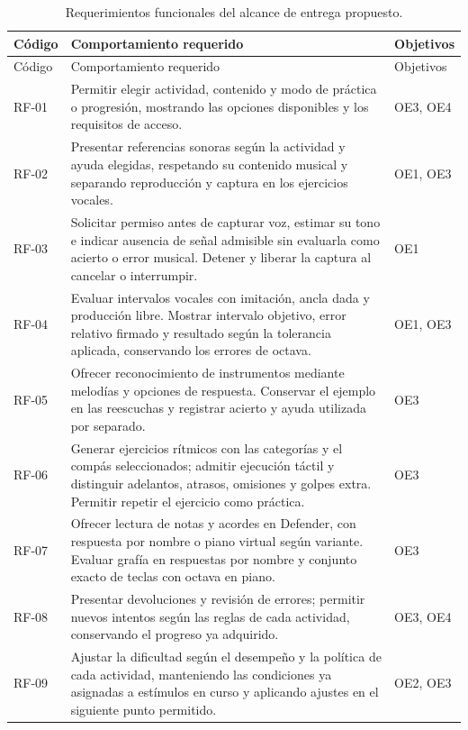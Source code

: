 \begingroup
\small
\singlespacing
\setlength{\tabcolsep}{4pt}
\setlength{\LTcapwidth}{\textwidth}
\begin{longtable}{p{}p{}p{}}
\caption{Requerimientos funcionales del alcance de entrega propuesto.}
\label{tab:requerimientos-funcionales}\\
\toprule
Código & Comportamiento requerido & Objetivos \\
\midrule
\endfirsthead
\toprule
Código & Comportamiento requerido & Objetivos \\
\midrule
\endhead
\bottomrule
\endfoot
RF-01 & Permitir elegir actividad, contenido y modo de práctica o progresión, mostrando las opciones disponibles y los requisitos de acceso. & OE3, OE4 \\
RF-02 & Presentar referencias sonoras según la actividad y ayuda elegidas, respetando su contenido musical y separando reproducción y captura en los ejercicios vocales. & OE1, OE3 \\
RF-03 & Solicitar permiso antes de capturar voz, estimar su tono e indicar ausencia de señal admisible sin evaluarla como acierto o error musical. Detener y liberar la captura al cancelar o interrumpir. & OE1 \\
RF-04 & Evaluar intervalos vocales con imitación, ancla dada y producción libre. Mostrar intervalo objetivo, error relativo firmado y resultado según la tolerancia aplicada, conservando los errores de octava. & OE1, OE3 \\
RF-05 & Ofrecer reconocimiento de instrumentos mediante melodías y opciones de respuesta. Conservar el ejemplo en las reescuchas y registrar acierto y ayuda utilizada por separado. & OE3 \\
RF-06 & Generar ejercicios rítmicos con las categorías y el compás seleccionados; admitir ejecución táctil y distinguir adelantos, atrasos, omisiones y golpes extra. Permitir repetir el ejercicio como práctica. & OE3 \\
RF-07 & Ofrecer lectura de notas y acordes en Defender, con respuesta por nombre o piano virtual según variante. Evaluar grafía en respuestas por nombre y conjunto exacto de teclas con octava en piano. & OE3 \\
RF-08 & Presentar devoluciones y revisión de errores; permitir nuevos intentos según las reglas de cada actividad, conservando el progreso ya adquirido. & OE3, OE4 \\
RF-09 & Ajustar la dificultad según el desempeño y la política de cada actividad, manteniendo las condiciones ya asignadas a estímulos en curso y aplicando ajustes en el siguiente punto permitido. & OE2, OE3 \\

\end{longtable}
